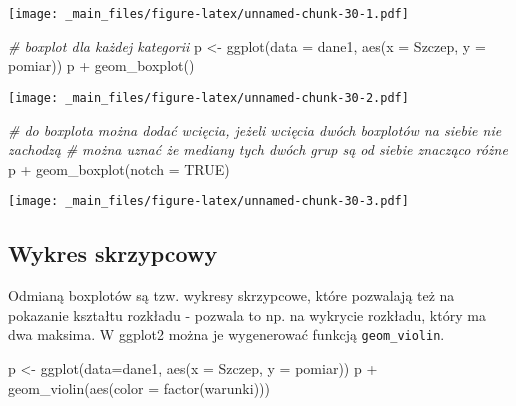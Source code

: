 \documentclass[
]{book}
\newenvironment{Shaded}{\begin{snugshade}}{\end{snugshade}}
\newcommand{\AttributeTok}[1]{\textcolor[rgb]{0.77,0.63,0.00}{#1}}
\newcommand{\CommentTok}[1]{\textcolor[rgb]{0.56,0.35,0.01}{\textit{#1}}}
\newcommand{\ConstantTok}[1]{\textcolor[rgb]{0.00,0.00,0.00}{#1}}
\newcommand{\FunctionTok}[1]{\textcolor[rgb]{0.00,0.00,0.00}{#1}}
\newcommand{\NormalTok}[1]{#1}
\newcommand{\OtherTok}[1]{\textcolor[rgb]{0.56,0.35,0.01}{#1}}
\newcommand{\SpecialCharTok}[1]{\textcolor[rgb]{0.00,0.00,0.00}{#1}}
\begin{document}
\texttt{[image: \_main\_files/figure-latex/unnamed-chunk-30-1.pdf]}

\begin{Shaded}
\begin{Highlighting}[]
\CommentTok{\# boxplot dla każdej kategorii}
\NormalTok{p }\OtherTok{\textless{}{-}} \FunctionTok{ggplot}\NormalTok{(}\AttributeTok{data =}\NormalTok{ dane1, }\FunctionTok{aes}\NormalTok{(}\AttributeTok{x =}\NormalTok{ Szczep, }\AttributeTok{y =}\NormalTok{ pomiar))}
\NormalTok{p }\SpecialCharTok{+} \FunctionTok{geom\_boxplot}\NormalTok{()}
\end{Highlighting}
\end{Shaded}

\texttt{[image: \_main\_files/figure-latex/unnamed-chunk-30-2.pdf]}

\begin{Shaded}
\begin{Highlighting}[]
\CommentTok{\# do boxplota można dodać wcięcia, jeżeli wcięcia dwóch boxplotów na siebie nie zachodzą }
\CommentTok{\# można uznać że mediany tych dwóch grup są od siebie znacząco różne}
\NormalTok{p }\SpecialCharTok{+} \FunctionTok{geom\_boxplot}\NormalTok{(}\AttributeTok{notch =} \ConstantTok{TRUE}\NormalTok{)}
\end{Highlighting}
\end{Shaded}

\texttt{[image: \_main\_files/figure-latex/unnamed-chunk-30-3.pdf]}

\hypertarget{wykres-skrzypcowy}{%
\subsection{Wykres skrzypcowy}\label{wykres-skrzypcowy}}

Odmianą boxplotów są tzw. wykresy skrzypcowe, które pozwalają też na pokazanie kształtu rozkładu - pozwala to np. na wykrycie rozkładu, który ma dwa maksima. W ggplot2 można je wygenerować funkcją \texttt{geom\_violin}.

\begin{Shaded}
\begin{Highlighting}[]
\NormalTok{p }\OtherTok{\textless{}{-}} \FunctionTok{ggplot}\NormalTok{(}\AttributeTok{data=}\NormalTok{dane1, }\FunctionTok{aes}\NormalTok{(}\AttributeTok{x =}\NormalTok{ Szczep, }\AttributeTok{y =}\NormalTok{ pomiar))}
\NormalTok{p }\SpecialCharTok{+} \FunctionTok{geom\_violin}\NormalTok{(}\FunctionTok{aes}\NormalTok{(}\AttributeTok{color =} \FunctionTok{factor}\NormalTok{(warunki)))}
\end{Highlighting}
\end{Shaded}
\end{document}
